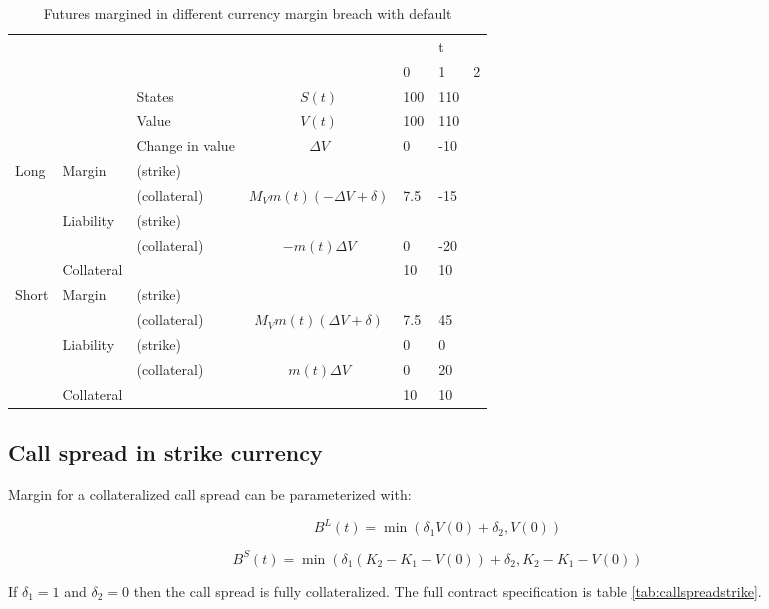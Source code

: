 \documentclass[12pt]{article}
\begin{document}
\begin{table}
\begin{tabular}{lll|c|lll}
&  &  &  &  & t &\\  
&  &  &  & 0 & 1 & 2 \\
\hline
\hline
&  & States &  $S(t)$ & 100 & 110 & \\
&  & Value  &  $V(t)$  & 100 & 110 &  \\
&  & Change in value & $\Delta V$ & 0& -10 &  \\
\hline
Long      & Margin    & (strike)     &  &  &  &  \\
          &           & (collateral) & $M_V m(t)(-\Delta V + \delta)$ & 7.5 & -15 &\\ 
          & Liability & (strike)     &  &  &  & \\ 
          &           & (collateral)&$-m(t) \Delta V$ & 0  & -20 &\\
          & Collateral&                       &    & 10 & 10 & \\
\hline
Short     & Margin    & (strike)     &   &  &  & \\
          &           & (collateral) & $M_V m(t)(\Delta V + \delta)$& 7.5 & 45 &\\
          & Liability & (strike)     &  & 0 & 0 & \\
          &           & (collateral) & $m(t)\Delta V$ & 0 & 20 &\\
          & Collateral&                       &    & 10 & 10 & \\ 
\hline          

\end{tabular}
\caption{Futures margined in different currency margin breach with default}
\label{fut}
\end{table}



\subsection{Call spread in strike currency}

Margin for a collateralized call spread can be parameterized with: 

\[ B^L(t) = \min(\delta_1 V(0) + \delta_2, V(0) ) \]

\[ B^S(t) = \min(\delta_1 (K_2-K_1-V(0)) + \delta_2, K_2-K_1-V(0) ) \]

If $\delta_1=1$ and $\delta_2=0$ then the call spread is fully collateralized. The full contract specification is table \ref{tab:callspreadstrike}.
\end{document}
